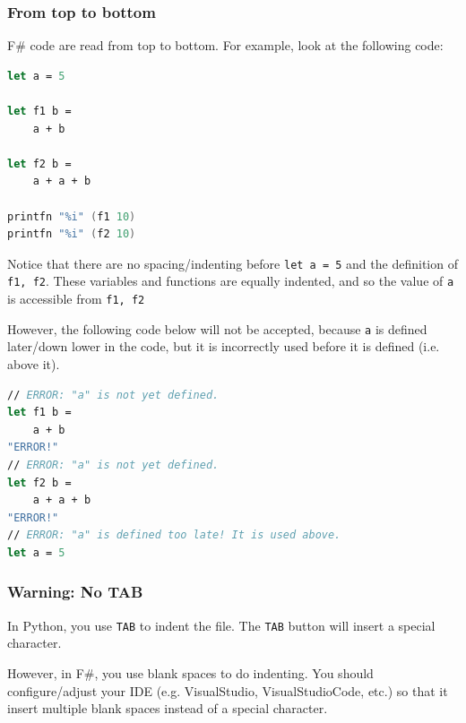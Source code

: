 \documentclass[12pt]{article}
\begin{document}
\subsubsection{From top to bottom}
F\# code are read from top to bottom. For example, look at the following code:
\begin{lstlisting}[language=FSharp]
let a = 5

let f1 b = 
    a + b

let f2 b = 
    a + a + b
    
printfn "%i" (f1 10)
printfn "%i" (f2 10)
\end{lstlisting}
Notice that there are no spacing/indenting before  \texttt{let a = 5} and the definition of \texttt{f1, f2}. These variables and functions are equally indented, and so the value of \texttt{a} is accessible from \texttt{f1, f2}

However, the following code below will not be accepted, because \texttt{a} is defined later/down lower in the code, but it is incorrectly used before it is defined (i.e. above it).

\begin{lstlisting}[language=FSharp]
// ERROR: "a" is not yet defined.
let f1 b = 
    a + b
"ERROR!"
// ERROR: "a" is not yet defined.
let f2 b = 
    a + a + b
"ERROR!"
// ERROR: "a" is defined too late! It is used above.
let a = 5
\end{lstlisting}

\subsubsection{Warning: No TAB}

In Python, you use \texttt{TAB} to indent the file. The \texttt{TAB} button will insert a special character.

However, in F\#, you use blank spaces to do indenting. You should configure/adjust your IDE (e.g. VisualStudio, VisualStudioCode, etc.) so that it insert multiple blank spaces instead of a special character.
\end{document}
